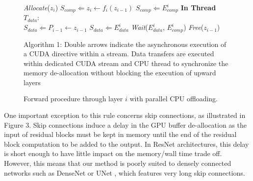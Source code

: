 \documentclass[11pt,onecolumn]{article}
\begin{document}
\begin{figure}[h]
\begin{algorithm}[H]
\vspace{1mm}
\vspace{1mm}
    \textit{Allocate}($z_i$)\;
	$S_{comp} \Leftarrow z_i \leftarrow f_i(z_{i-1})$\;
	$S_{comp} \Leftarrow E_{comp}^i$\;
\vspace{1mm}
	\textbf{In Thread}  $T_{data}$:\\
		\hspace{1.1cm} 	$S_{data} \Leftarrow P_{i-1} \leftarrow z_{i-1}$\;
		\hspace{1.1cm}  $S_{data} \Leftarrow E_{data}^i$\;
		\hspace{1.1cm}  \textit{Wait}($E_{data}^i$, $E_{comp}^i$)\;
		\hspace{1.1cm}  \textit{Free}($z_{i-1}$)\;
	\caption{Forward procedure through layer $i$ with parallel CPU offloading. }
\end{algorithm}
\small{Algorithm 1: Double arrows indicate the asynchronous execution of a CUDA directive within a stream.
Data transfers are executed within dedicated CUDA stream and CPU thread to
synchronize the memory de-allocation without blocking the execution of upward layers}
\end{figure}


One important exception to this rule concerns skip connections, as illustrated in Figure 3.
Skip connections induce a delay in the GPU buffer de-allocation as the input of residual blocks must
be kept in memory until the end of the residual block computation to be added to the output.
In ResNet architectures, this delay is short enough to have little impact on the memory/wall time trade off.
However, this means that our method is poorly suited to densely connected 
networks such as DenseNet \cite{huang2017densely} or UNet \cite{ronneberger2015u}, which features very long skip connections.
\end{document}
